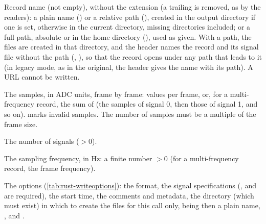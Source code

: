 \begin{params}
\item[record] Record name (not empty), without the  extension (a trailing
   is removed, as by the readers): a plain name
  () or a relative path (), created in the output directory
  if one is set, otherwise in the current directory, missing directories included; or a
  full path, absolute or in the home directory (),
  used as given. With a path, the files are created in that directory, and the header
  names the record and its signal file without the path (, ), so
  that the record opens under any path that leads to it (in legacy mode, as in the
  original, the header gives the name with its path). A URL cannot be written.
\item[samples] The samples, in ADC units, frame by frame:  values per frame,
  or, for a multi-frequency record, the sum of  (the samples
  of signal 0, then those of signal 1, and so on).  marks
  invalid samples. The number of samples must be a multiple of the frame size.
\item[nsig] The number of signals ($> 0$).
\item[fs] The sampling frequency, in Hz: a finite number $> 0$ (for a multi-frequency
  record, the frame frequency).
\item[opt] The options (\cref{tab:rust-writeoptions}): the format, the signal
  specifications (,  and  are required), the start
  time, the comments and metadata, the directory  (which must exist) in which to
  create the files for this call only,  being then a plain name,
  , and .
\end{params}
